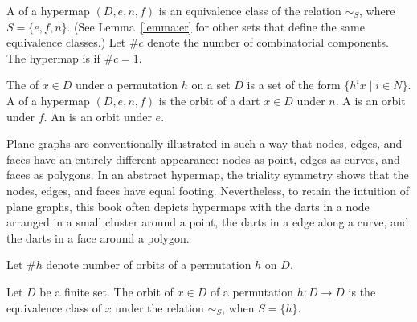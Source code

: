 \begin{definition}
A  of a hypermap $(D,e,n,f)$ is an 
equivalence class of the relation $\sim_S$, where
$S=\{e,f,n\}$. 
(See Lemma~\ref{lemma:er} for other sets that define the same equivalence classes.)  
Let $\#c$ denote the
number of combinatorial components.  The hypermap is  if
$\#c=1$.  %
%
%
%
%
\end{definition}





\begin{definition}
The  of $x\in D$ under a permutation $h$ on
a set $D$ is a set of the form $\{h^i x\mid i\in\ring{N}\}$.  A 
of a hypermap $(D,e,n,f)$ is the orbit of a dart $x\in D$ under $n$.  
A  is an orbit under $f$.  
An  is an
orbit under $e$.  %
%
%
\end{definition}

Plane graphs are conventionally illustrated in such a way that nodes,
edges, and faces have an entirely different appearance: nodes as
point, edges as curves, and faces as polygons.  In an abstract
hypermap, the triality symmetry shows that the nodes, edges, and faces
have equal footing.  Nevertheless, to retain the intuition of plane
graphs, this book  often depicts hypermaps with the darts in a node
arranged in a small cluster around a point, the darts in a edge along
a curve, and the darts in a face around a polygon.

Let $\#h$ denote
number of orbits of a permutation $h$ on $D$.  
%
%


\begin{lemma}[orbit]
Let $D$ be a finite set.  The orbit of $x\in D$ of a permutation $h:D\to D$
is the equivalence class of $x$ under the relation $\sim_S$, when $S=\{h\}$.
\end{lemma}

